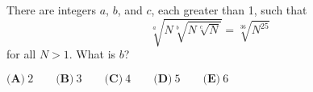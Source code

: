 There are integers $a$, $b$, and $c$, each greater than 1, such that $$\sqrt[a]{N \sqrt[b]{N \sqrt[c]{N}}} = \sqrt[36]{N^{25}}$$ for all $N > 1$. What is $b$?

$\textbf{(A)}\ 2\qquad\textbf{(B)}\ 3\qquad\textbf{(C)}\ 4\qquad\textbf{(D)}\ 5\qquad\textbf{(E)}\ 6$